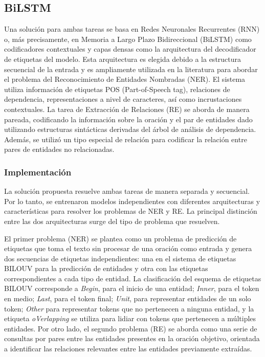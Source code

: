 \documentclass[10pt]{article} %
\begin{document}
	\subsection{BiLSTM} 
	Una solución para ambas tareas se basa en Redes Neuronales Recurrentes (RNN) o, más precisamente, en Memoria a Largo Plazo Bidireccional (BiLSTM) como codificadores contextuales y capas densas como la arquitectura del decodificador de etiquetas del modelo. Esta arquitectura es elegida debido a la estructura secuencial de la entrada y es ampliamente utilizada en la literatura  para abordar el problema del Reconocimiento de Entidades Nombradas (NER). El sistema utiliza información de etiquetas POS (Part-of-Speech tag), relaciones de dependencia, representaciones a nivel de caracteres, así como incrustaciones contextuales. La tarea de Extracción de Relaciones (RE) se aborda de manera pareada, codificando la información sobre la oración y el par de entidades dado utilizando estructuras sintácticas derivadas del árbol de análisis de dependencia. Además, se utilizó un tipo especial de relación para codificar la relación entre pares de entidades no relacionadas.
	
	\subsubsection{Implementaci\'on} 
	La solución propuesta resuelve ambas tareas de manera separada y secuencial. Por lo tanto, se entrenaron modelos independientes con diferentes arquitecturas y características para resolver los problemas de NER y RE. La principal distinción entre las dos arquitecturas surge del tipo de problema que resuelven. 
	
	El primer problema (NER) se plantea como un problema de predicción de etiquetas que toma el texto sin procesar de una oración como entrada y genera dos secuencias de etiquetas independientes: una en el sistema de etiquetas BILOUV para la predicción de entidades y otra con las etiquetas correspondientes a cada tipo de entidad. La clasificación del esquema de etiquetas BILOUV corresponde a \textit{Begin}, para el inicio de una entidad; \textit{Inner}, para el token en medio; \textit{Last}, para el token final; \textit{Unit}, para representar entidades de un solo token; \textit{Other} para representar tokens que no pertenecen a ninguna entidad, y la etiqueta \textit{oVerlapping} se utiliza para lidiar con tokens que pertenecen a múltiples entidades. Por otro lado, el segundo problema (RE) se aborda como una serie de consultas por pares entre las entidades presentes en la oración objetivo, orientada a identificar las relaciones relevantes entre las entidades previamente extraídas. 
	
\end{document}
